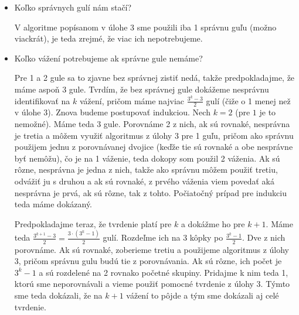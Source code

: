 
\begin{itemize}
    \item Koľko správnych gulí nám stačí?

    V algoritme popísanom v úlohe 3 sme použili iba 1 správnu guľu 
    (možno viackrát), je teda zrejmé, že viac ich nepotrebujeme.

    \item Koľko vážení potrebujeme ak správne gule nemáme?

    Pre 1 a 2 gule sa to zjavne bez správnej zistiť nedá, takže 
    predpokladajme, že máme aspoň 3 gule. Tvrdím, že bez správnej gule 
    dokážeme nesprávnu identifikovať na $k$ vážení, pričom máme najviac 
    $\frac{3^k-3}{2}$ gulí (čiže o 1 menej než v úlohe 3). Znova budeme 
    postupovať indukciou. Nech $k=2$ (pre $1$ je to nemožné). Máme 
    teda $3$ gule. Porovnáme 2 z nich, ak sú rovnaké, nesprávna je 
    tretia a môžem využiť algoritmus z úlohy 3 pre 1 guľu, pričom ako 
    správnu použijem jednu z porovnávanej dvojice (keďže tie sú 
    rovnaké a obe nesprávne byť nemôžu), čo je na 1 váženie, teda 
    dokopy som použil 2 váženia. Ak sú rôzne, nesprávna je jedna 
    z nich, takže ako správnu môžem použiť tretiu, odvážiť ju s druhou 
    a ak sú rovnaké, z prvého váženia viem povedať aká nesprávna je 
    prvá, ak sú rôzne, tak z tohto. Počiatočný prípad pre indukciu teda 
    máme dokázaný. 

    Predpokladajme teraz, že tvrdenie platí pre $k$ a dokážme ho 
    pre $k+1$. Máme teda $\frac{3^{k+1}-3}{2}=\frac{3\cdot (3^k-1)}{2}$ 
    gulí. Rozdeľme ich na 3 kôpky po $\frac{3^k-1}{2}$. Dve z nich 
    porovnáme. Ak sú rovnaké, zoberieme tretiu a použijeme algoritmus 
    z úlohy 3, pričom správnu gulu budú tie z porovnávania. Ak sú 
    rôzne, ich počet je $3^k-1$ a sú rozdelené na 2 rovnako početné 
    skupiny. Pridajme k nim teda 1, ktorú sme neporovnávali a vieme 
    použiť pomocné tvrdenie z úlohy 3. Týmto sme teda dokázali, že na 
    $k+1$ vážení to pôjde a tým sme dokázali aj celé tvrdenie. 
\end{itemize}

